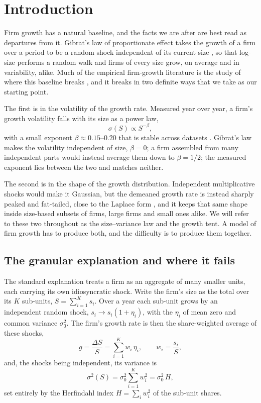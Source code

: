 \chapter{Introduction}
\label{chap:intro}

Firm growth has a natural baseline, and the facts we are after are best read as departures from
it. Gibrat's law of proportionate effect takes the growth of a firm over a period to be a random
shock independent of its current size \citep{gibrat1931}, so that log-size performs a random walk
and firms of every size grow, on average and in variability, alike. Much of the empirical
firm-growth literature is the study of where this baseline breaks \citep{sutton1997}, and it
breaks in two definite ways that we take as our starting point.

The first is in the volatility of the growth rate. Measured year over year,
a firm's growth volatility falls with its size as a power law,
\begin{equation}
  \sigma(S) \propto S^{-\beta},
  \label{eq:intro-sizevar}
\end{equation}
with a small exponent $\beta \approx 0.15$--$0.20$ that is stable across datasets
\citep{stanley1996, amaral1997}. Gibrat's law makes the volatility independent of size,
$\beta = 0$; a firm assembled from many independent parts would instead average them down to
$\beta = 1/2$; the measured exponent lies between the two and matches neither.

The second is in the shape of the growth distribution. Independent multiplicative shocks would
make it Gaussian, but the demeaned growth rate is instead sharply peaked and fat-tailed, close to
the Laplace form \citep{stanley1996, bottazzi2006}, and it keeps that same shape inside size-based
subsets of firms, large firms and small ones alike. We will refer to these two throughout as the
size--variance law and the growth tent. A model of firm growth has to produce both, and the
difficulty is to produce them together.

\section{The granular explanation and where it fails}
\label{sec:intro-granular}

The standard explanation treats a firm as an aggregate of many smaller units, each carrying
its own idiosyncratic shock. Write the firm's size as the
total over its $K$ sub-units, $S = \sum_{i=1}^{K} s_i$. Over a year each sub-unit grows by an
independent random shock, $s_i \to s_i(1 + \eta_i)$, with the $\eta_i$ of mean zero and common
variance $\sigma_0^2$. The firm's growth rate is then the share-weighted average of these
shocks,
\begin{equation}
  g = \frac{\Delta S}{S} = \sum_{i=1}^{K} w_i\, \eta_i,
  \qquad w_i = \frac{s_i}{S},
\end{equation}
and, the shocks being independent, its variance is
\begin{equation}
  \sigma^2(S) = \sigma_0^2 \sum_{i=1}^{K} w_i^2 = \sigma_0^2\, H,
\end{equation}
set entirely by the Herfindahl index $H = \sum_i w_i^2$ of the sub-unit shares.

